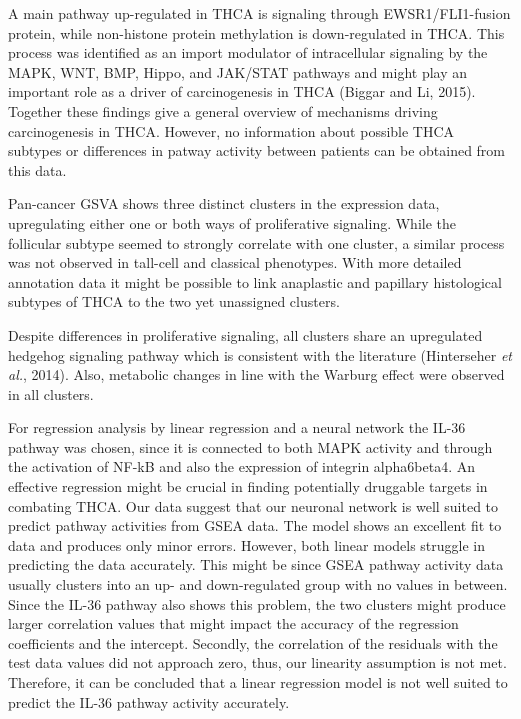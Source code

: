 \documentclass[
  parskip,
  oneside]{scrreprt}
\begin{document}
A main pathway up-regulated in THCA is signaling through
EWSR1/FLI1-fusion protein, while non-histone protein methylation is
down-regulated in THCA. This process was identified as an import
modulator of intracellular signaling by the MAPK, WNT, BMP, Hippo, and
JAK/STAT pathways and might play an important role as a driver of
carcinogenesis in THCA (Biggar and Li, 2015). Together these findings
give a general overview of mechanisms driving carcinogenesis in THCA.
However, no information about possible THCA subtypes or differences in
patway activity between patients can be obtained from this data.

Pan-cancer GSVA shows three distinct clusters in the expression data,
upregulating either one or both ways of proliferative signaling. While
the follicular subtype seemed to strongly correlate with one cluster, a
similar process was not observed in tall-cell and classical phenotypes.
With more detailed annotation data it might be possible to link
anaplastic and papillary histological subtypes of THCA to the two yet
unassigned clusters.

Despite differences in proliferative signaling, all clusters share an
upregulated hedgehog signaling pathway which is consistent with the
literature (Hinterseher \emph{et al.}, 2014). Also, metabolic changes in
line with the Warburg effect were observed in all clusters.

For regression analysis by linear regression and a neural network the
IL-36 pathway was chosen, since it is connected to both MAPK activity
and through the activation of NF-kB and also the expression of integrin
alpha6beta4. An effective regression might be crucial in finding
potentially druggable targets in combating THCA. Our data suggest that
our neuronal network is well suited to predict pathway activities from
GSEA data. The model shows an excellent fit to data and produces only
minor errors. However, both linear models struggle in predicting the
data accurately. This might be since GSEA pathway activity data usually
clusters into an up- and down-regulated group with no values in between.
Since the IL-36 pathway also shows this problem, the two clusters might
produce larger correlation values that might impact the accuracy of the
regression coefficients and the intercept. Secondly, the correlation of
the residuals with the test data values did not approach zero, thus, our
linearity assumption is not met. Therefore, it can be concluded that a
linear regression model is not well suited to predict the IL-36 pathway
activity accurately.
\end{document}
